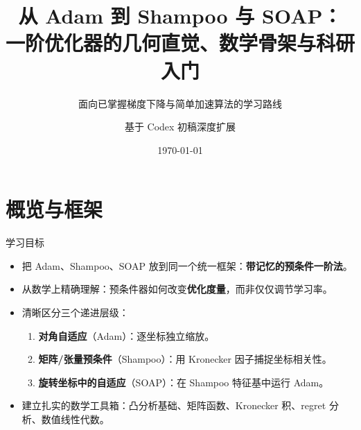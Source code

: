\documentclass[aspectratio=169,10pt]{ctexbeamer}
\title[Adam, Shampoo, SOAP]{从 Adam 到 Shampoo 与 SOAP：\\[0.3em] 一阶优化器的几何直觉、数学骨架与科研入门}
\subtitle{面向已掌握梯度下降与简单加速算法的学习路线}
\author{基于 Codex 初稿深度扩展}
\date{\today}
\begin{document}
\begin{frame}
  \titlepage
\end{frame}

\section{概览与框架}

\begin{frame}{学习目标}
  \begin{itemize}
    \item 把 Adam、Shampoo、SOAP 放到同一个统一框架：\textbf{带记忆的预条件一阶法}。
    \item 从数学上精确理解：预条件器如何改变\textbf{优化度量}，而非仅仅调节学习率。
    \item 清晰区分三个递进层级：
    \begin{enumerate}
      \item \textbf{对角自适应}（Adam）：逐坐标独立缩放。
      \item \textbf{矩阵/张量预条件}（Shampoo）：用 Kronecker 因子捕捉坐标相关性。
      \item \textbf{旋转坐标中的自适应}（SOAP）：在 Shampoo 特征基中运行 Adam。
    \end{enumerate}
    \item 建立扎实的数学工具箱：凸分析基础、矩阵函数、Kronecker 积、regret 分析、数值线性代数。
  \end{itemize}
\end{frame}
\end{document}
